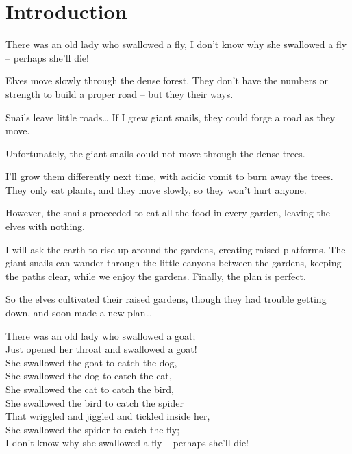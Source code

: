 \section{Introduction}

\begin{multicols}{2}

\begin{exampletext}
  There was an old lady who swallowed a fly,
  I don't know why she swallowed a fly – perhaps she'll die!
\end{exampletext}

Elves move slowly through the dense forest.
They don't have the numbers or strength to build a proper road -- but they their ways.

\begin{exampletext}
  Snails leave little roads\ldots
  If I grew giant snails, they could forge a road as they move.
\end{exampletext}

Unfortunately, the giant snails could not move through the dense trees.

\begin{exampletext}
  I'll grow them differently next time, with acidic vomit to burn away the trees.
  They only eat plants, and they move slowly, so they won't hurt anyone.
\end{exampletext}

However, the snails proceeded to eat all the food in every garden, leaving the elves with nothing.

\begin{exampletext}
  I will ask the earth to rise up around the gardens, creating raised platforms.
  The giant snails can wander through the little canyons between the gardens, keeping the paths clear, while we enjoy the gardens.
  Finally, the plan is perfect.
\end{exampletext}

So the elves cultivated their raised gardens, though they had trouble getting down, and soon made a new plan\ldots

\begin{exampletext}
  \noindent
  There was an old lady who swallowed a goat; \\
  Just opened her throat and swallowed a goat! \\
  She swallowed the goat to catch the dog, \\
  She swallowed the dog to catch the cat, \\
  She swallowed the cat to catch the bird, \\
  She swallowed the bird to catch the spider \\
  That wriggled and jiggled and tickled inside her, \\
  She swallowed the spider to catch the fly; \\
  I don't know why she swallowed a fly – perhaps she'll die! \\
\end{exampletext}


\end{multicols}
